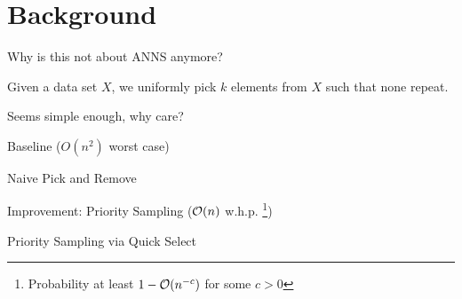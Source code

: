 \section{Background}

\begin{frame}{}
  \begin{center}
    \Large{Why is this not about ANNS anymore?}
  \end{center}
\end{frame}

\begin{frame}{}
  \begin{definition}
    Given a data set \(X\), we uniformly pick \(k\) elements
    from \(X\) such that none repeat.
  \end{definition}

  \vspace{2em}

  Seems simple enough, why care?
\end{frame}

\begin{frame}{Baseline (\(O(n^2)\) worst case)}
  \begin{algorithm}[H]
  \caption{Naive Pick and Remove}
  \begin{algorithmic}
    \EndFor
  \end{algorithmic}
  \end{algorithm}
\end{frame}

\begin{frame}{Improvement: Priority Sampling (\(\mathcal{O}(n)\) w.h.p.
  \footnote{Probability at least \(1 - \mathcal{O}(n^{-c})\) for some
  \(c > 0\)})}
  \begin{algorithm}[H]
  \caption{Priority Sampling via Quick Select}
  \begin{algorithmic}

  \end{algorithmic}
  \end{algorithm}
\end{frame}

